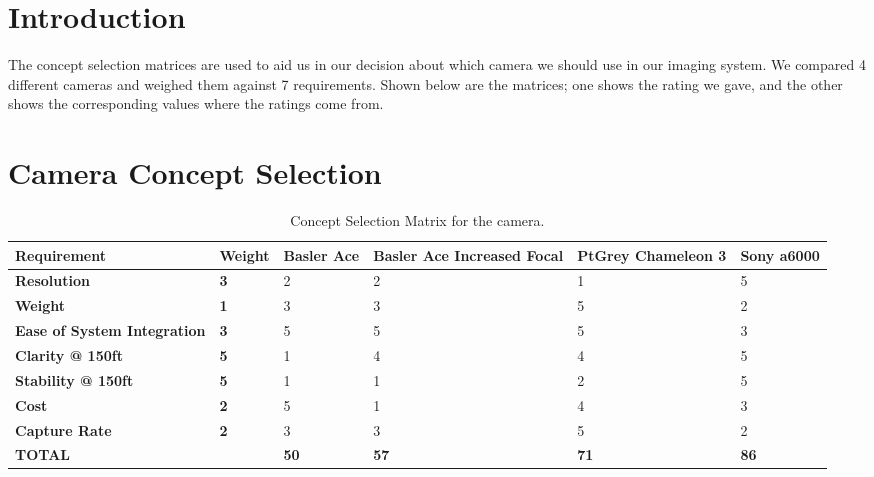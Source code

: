 \documentclass[]{auvsi_doc}
\begin{document}
\begin{AUVSITitlePage}
\begin{artifacttable}
\end{artifacttable}
\end{AUVSITitlePage}

\section{Introduction}

The concept selection matrices are used to aid us in our decision about which camera we should use in our imaging system.
We compared 4 different cameras and weighed them against 7 requirements.
Shown below are the matrices; one shows the rating we gave, and the other shows the corresponding values where the ratings come from.

\section{Camera Concept Selection}
\begin{table}[H]
\centering
\caption{Concept Selection Matrix for the camera.}
\begin{tabular}{|p{3.45cm}|p{1.5cm}|p{1.55cm}|p{2.5cm}|p{2.5cm}|p{2.0cm}|}
\hline
\rowcolor[HTML]{C0C0C0}
{\color[HTML]{000000} \textbf{Requirement}} & {\color[HTML]{000000} \textbf{Weight}} & {\color[HTML]{000000} \textbf{Basler Ace}} & {\color[HTML]{000000} \textbf{Basler Ace Increased Focal}} & {\color[HTML]{000000} \textbf{PtGrey Chameleon 3}} & {\color[HTML]{000000} \textbf{Sony a6000}}\\ \hline
{\color[HTML]{000000} \textbf{Resolution}}	& \textbf{3}	& 2	& 2	& 1	& 5 \\ \hline
{\color[HTML]{000000} \textbf{Weight}}	&	\textbf{1}	&	3 &	3 	& 	5 	&	2 \\ \hline
{\color[HTML]{000000} \textbf{Ease of System Integration}}	&	\textbf{3} 	&	5 	& 	5 	& 	5 	& 	3 \\ \hline
{\color[HTML]{000000} \textbf{Clarity @ 150ft}}	&	\textbf{5} 	&	1 	& 	4	&	4	&	5 \\ \hline
{\color[HTML]{000000} \textbf{Stability @ 150ft}}	&	\textbf{5} 	&	1 	&	1 	&	2	&	5 \\ \hline
{\color[HTML]{000000} \textbf{Cost}}	&	\textbf{2} 	&	5 	&	1 	&	4	&	3 \\ \hline
{\color[HTML]{000000} \textbf{Capture Rate}}	&	\textbf{2} 	&	3 	&	3 	&	5 	&	2 \\ \hline
\rowcolor[HTML]{C0C0C0}
{\color[HTML]{000000} \textbf{TOTAL}}	&	&	{\color[HTML]{000000} \textbf{50}}	&	{\color[HTML]{000000} \textbf{57}}	&	{\color[HTML]{000000} \textbf{71}}	&	{\color[HTML]{000000} \textbf{86}} \\ \hline
\end{tabular}
\end{table}
\end{document}
